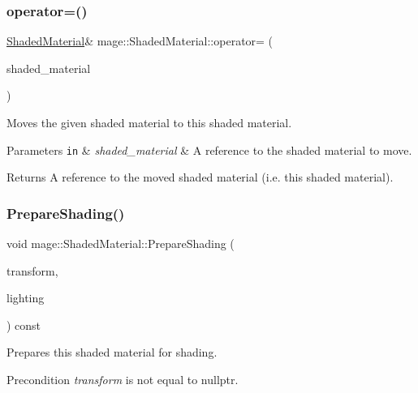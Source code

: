 \subsubsection{\texorpdfstring{operator=()}{operator=()}\hspace{0.1cm}{\footnotesize\ttfamily [2/2]}}
{\footnotesize\ttfamily \hyperlink{structmage_1_1_shaded_material}{Shaded\+Material}\& mage\+::\+Shaded\+Material\+::operator= (\begin{DoxyParamCaption}\item[{\hyperlink{structmage_1_1_shaded_material}{Shaded\+Material} \&\&}]{shaded\+\_\+material }\end{DoxyParamCaption})\hspace{0.3cm}{\ttfamily [default]}}

Moves the given shaded material to this shaded material.


\begin{DoxyParams}[1]{Parameters}
\mbox{\tt in}  & {\em shaded\+\_\+material} & A reference to the shaded material to move. \\
\hline
\end{DoxyParams}
\begin{DoxyReturn}{Returns}
A reference to the moved shaded material (i.\+e. this shaded material). 
\end{DoxyReturn}
\hypertarget{structmage_1_1_shaded_material_a53336b2d98e414a73ad64f3176b5e996}{}\label{structmage_1_1_shaded_material_a53336b2d98e414a73ad64f3176b5e996} 
\subsubsection{\texorpdfstring{Prepare\+Shading()}{PrepareShading()}}
{\footnotesize\ttfamily void mage\+::\+Shaded\+Material\+::\+Prepare\+Shading (\begin{DoxyParamCaption}\item[{I\+D3\+D11\+Buffer $\ast$}]{transform,  }\item[{const \hyperlink{structmage_1_1_lighting}{Lighting} \&}]{lighting }\end{DoxyParamCaption}) const}

Prepares this shaded material for shading.

\begin{DoxyPrecond}{Precondition}
{\itshape transform} is not equal to {\ttfamily nullptr}. 
\end{DoxyPrecond}

